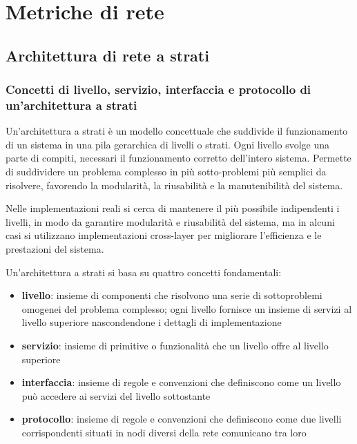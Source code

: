 \section{Metriche di rete}
\subsection{Architettura di rete a strati}
\subsubsection*{Concetti di livello, servizio, interfaccia e protocollo di un'architettura a strati}
Un'architettura a strati è un modello concettuale che suddivide il funzionamento di un sistema in una pila gerarchica
di livelli o strati. Ogni livello svolge una parte di compiti, necessari il funzionamento corretto dell'intero sistema.
Permette di suddividere un problema complesso in più sotto-problemi più semplici da risolvere, favorendo la modularità,
la riusabilità e la manutenibilità del sistema.

Nelle implementazioni reali si cerca di mantenere il più possibile indipendenti i livelli, in modo da garantire modularità
e riusabilità del sistema, ma in alcuni casi si utilizzano implementazioni cross-layer per migliorare l'efficienza e le
prestazioni del sistema.

Un'architettura a strati si basa su quattro concetti fondamentali:
\begin{itemize}
	\item \textbf{livello}: insieme di componenti che risolvono una serie di sottoproblemi omogenei del problema complesso;
	ogni livello fornisce un insieme di servizi al livello superiore nascondendone i dettagli di implementazione
	\item \textbf{servizio}: insieme di primitive o funzionalità che un livello offre al livello superiore
	\item \textbf{interfaccia}: insieme di regole e convenzioni che definiscono come un livello può accedere ai servizi
	del livello sottostante
	\item \textbf{protocollo}: insieme di regole e convenzioni che definiscono come due livelli corrispondenti situati
	in nodi diversi della rete comunicano tra loro
\end{itemize}

